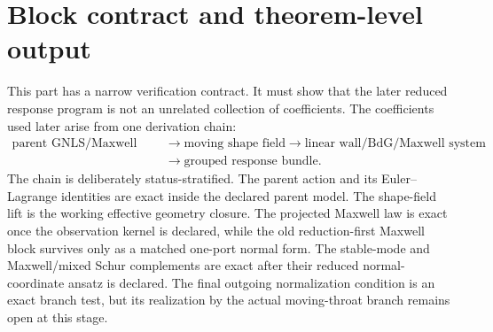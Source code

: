 \section{Block contract and theorem-level output}
\label{sec:part01-block-contract}

This part has a narrow verification contract.  It must show that the later reduced response program is not an unrelated collection of coefficients.  The coefficients used later arise from one derivation chain:
\begin{equation}
\label{eq:part01-chain-overview}
\begin{aligned}
\text{parent GNLS/Maxwell theory}
&\longrightarrow
\text{moving shape field}
\longrightarrow
\text{linear wall/BdG/Maxwell system}
\\
&\longrightarrow
\text{grouped response bundle}.
\end{aligned}
\end{equation}
The chain is deliberately status-stratified.  The parent action and its Euler--Lagrange identities are exact inside the declared parent model.  The shape-field lift is the working effective geometry closure.  The projected Maxwell law is exact once the observation kernel is declared, while the old reduction-first Maxwell block survives only as a matched one-port normal form.  The stable-mode and Maxwell/mixed Schur complements are exact after their reduced normal-coordinate ansatz is declared.  The final outgoing normalization condition is an exact branch test, but its realization by the actual moving-throat branch remains open at this stage.

